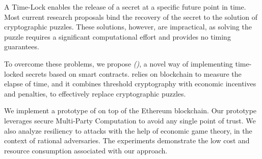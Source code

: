 A Time-Lock enables the release of a secret at a specific future point in time.
Most current research proposals bind the recovery of the secret to the solution of cryptographic puzzles.
These solutions, however, are  impractical, as solving the puzzle requires a significant computational effort and provides no timing guarantees.

To overcome these problems, we propose {\em \name (\shortname)}, a novel way of implementing time-locked secrets based on smart contracts.
\shortname relies on blockchain to measure the elapse of time, and it combines threshold cryptography with economic incentives and penalties, to effectively replace cryptographic puzzles.


We implement a prototype of \shortname on top of the Ethereum blockchain. 
Our prototype leverages secure Multi-Party Computation to avoid any single point of trust.
We also analyze resiliency to attacks with the help of economic game theory, in the context of rational adversaries.
The experiments demonstrate the low cost and resource consumption associated with our approach.  
